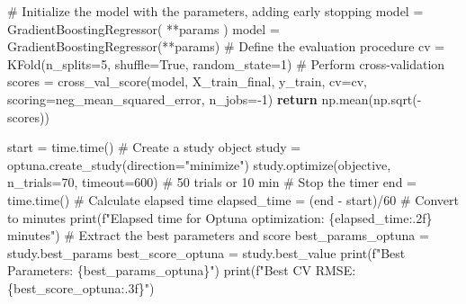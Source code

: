 \documentclass[
  letterpaper,
  DIV=11,
  numbers=noendperiod]{scrreprt}
\newenvironment{Shaded}{\begin{snugshade}}{\end{snugshade}}
\newcommand{\BuiltInTok}[1]{\textcolor[rgb]{0.00,0.23,0.31}{#1}}
\newcommand{\CommentTok}[1]{\textcolor[rgb]{0.37,0.37,0.37}{#1}}
\newcommand{\ControlFlowTok}[1]{\textcolor[rgb]{0.00,0.23,0.31}{\textbf{#1}}}
\newcommand{\DecValTok}[1]{\textcolor[rgb]{0.68,0.00,0.00}{#1}}
\newcommand{\NormalTok}[1]{\textcolor[rgb]{0.00,0.23,0.31}{#1}}
\newcommand{\OperatorTok}[1]{\textcolor[rgb]{0.37,0.37,0.37}{#1}}
\newcommand{\SpecialCharTok}[1]{\textcolor[rgb]{0.37,0.37,0.37}{#1}}
\newcommand{\SpecialStringTok}[1]{\textcolor[rgb]{0.13,0.47,0.30}{#1}}
\newcommand{\StringTok}[1]{\textcolor[rgb]{0.13,0.47,0.30}{#1}}
\newcommand{\VariableTok}[1]{\textcolor[rgb]{0.07,0.07,0.07}{#1}}
\begin{document}
\begin{Shaded}
\begin{Highlighting}[]
    \CommentTok{\# Initialize the model with the parameters, adding early stopping}
\NormalTok{    model }\OperatorTok{=}\NormalTok{ GradientBoostingRegressor(}
        \OperatorTok{**}\NormalTok{params}
\NormalTok{    )}
\NormalTok{    model }\OperatorTok{=}\NormalTok{ GradientBoostingRegressor(}\OperatorTok{**}\NormalTok{params)}
    \CommentTok{\# Define the evaluation procedure}
\NormalTok{    cv }\OperatorTok{=}\NormalTok{ KFold(n\_splits}\OperatorTok{=}\DecValTok{5}\NormalTok{, shuffle}\OperatorTok{=}\VariableTok{True}\NormalTok{, random\_state}\OperatorTok{=}\DecValTok{1}\NormalTok{)}
    \CommentTok{\# Perform cross{-}validation}
\NormalTok{    scores }\OperatorTok{=}\NormalTok{ cross\_val\_score(model, X\_train\_final, y\_train, cv}\OperatorTok{=}\NormalTok{cv, scoring}\OperatorTok{=}\StringTok{\textquotesingle{}neg\_mean\_squared\_error\textquotesingle{}}\NormalTok{, n\_jobs}\OperatorTok{={-}}\DecValTok{1}\NormalTok{)}
    \ControlFlowTok{return}\NormalTok{ np.mean(np.sqrt(}\OperatorTok{{-}}\NormalTok{scores)) }
\end{Highlighting}
\end{Shaded}

\begin{Shaded}
\begin{Highlighting}[]

\NormalTok{start }\OperatorTok{=}\NormalTok{ time.time()}
\CommentTok{\# Create a study object}
\NormalTok{study }\OperatorTok{=}\NormalTok{ optuna.create\_study(direction}\OperatorTok{=}\StringTok{"minimize"}\NormalTok{)}
\NormalTok{study.optimize(objective, n\_trials}\OperatorTok{=}\DecValTok{70}\NormalTok{, timeout}\OperatorTok{=}\DecValTok{600}\NormalTok{)  }\CommentTok{\# 50 trials or 10 min}
\CommentTok{\# Stop the timer}
\NormalTok{end }\OperatorTok{=}\NormalTok{ time.time()}
\CommentTok{\# Calculate elapsed time}
\NormalTok{elapsed\_time }\OperatorTok{=}\NormalTok{ (end }\OperatorTok{{-}}\NormalTok{ start)}\OperatorTok{/}\DecValTok{60}  \CommentTok{\# Convert to minutes}
\BuiltInTok{print}\NormalTok{(}\SpecialStringTok{f"Elapsed time for Optuna optimization: }\SpecialCharTok{\{}\NormalTok{elapsed\_time}\SpecialCharTok{:.2f\}}\SpecialStringTok{ minutes"}\NormalTok{)}
\CommentTok{\# Extract the best parameters and score}
\NormalTok{best\_params\_optuna }\OperatorTok{=}\NormalTok{ study.best\_params}
\NormalTok{best\_score\_optuna }\OperatorTok{=}\NormalTok{ study.best\_value}
\BuiltInTok{print}\NormalTok{(}\SpecialStringTok{f"Best Parameters: }\SpecialCharTok{\{}\NormalTok{best\_params\_optuna}\SpecialCharTok{\}}\SpecialStringTok{"}\NormalTok{)}
\BuiltInTok{print}\NormalTok{(}\SpecialStringTok{f"Best CV RMSE: }\SpecialCharTok{\{}\NormalTok{best\_score\_optuna}\SpecialCharTok{:.3f\}}\SpecialStringTok{"}\NormalTok{)}
\end{Highlighting}
\end{Shaded}
\end{document}
